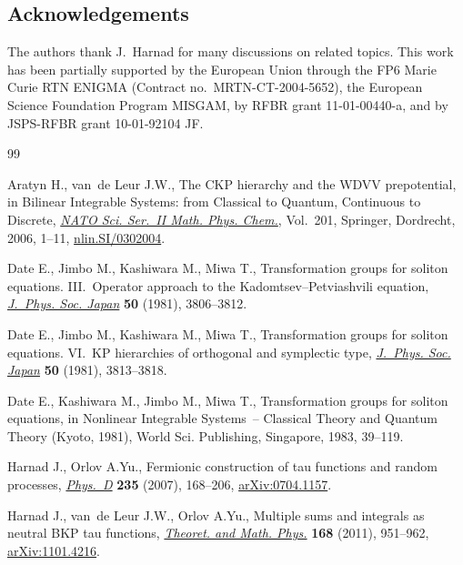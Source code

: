 \documentclass[pdftex]{sigma}
\numberwithin{equation}{section}
\begin{document}
\subsection*{Acknowledgements}

The authors thank J.~Harnad for many discussions on related topics.
This work has been partially supported by
the European Union through the FP6 Marie Curie RTN
ENIGMA (Contract no.~MRTN-CT-2004-5652), the European Science
Foundation Program MISGAM, by RFBR grant 11-01-00440-a, and by
JSPS-RFBR grant 10-01-92104 JF.

\begin{thebibliography}{99}
\footnotesize\itemsep=0pt

Aratyn H., van~de Leur J.W., The {CKP} hierarchy and the {WDVV} prepotential, in
  Bilinear Integrable Systems: from Classical to Quantum, Continuous to
  Discrete, \href{http://dx.doi.org/10.1007/978-1-4020-3503-6_1}{\textit{NATO Sci. Ser.~II Math. Phys. Chem.}}, Vol.~201, Springer,
  Dordrecht, 2006, 1--11, \href{http://arxiv.org/abs/nlin.SI/0302004}{nlin.SI/0302004}.

Date E., Jimbo M., Kashiwara M., Miwa T., Transformation groups for soliton
  equations. {III}.~{O}perator approach to the {K}adomtsev--{P}etviashvili
  equation, \href{http://dx.doi.org/10.1143/JPSJ.50.3806}{\textit{J.~Phys. Soc. Japan}} \textbf{50} (1981), 3806--3812.

Date E., Jimbo M., Kashiwara M., Miwa T., Transformation groups for soliton
  equations. {VI}.~{KP} hierarchies of orthogonal and symplectic type,
  \href{http://dx.doi.org/10.1143/JPSJ.50.3813}{\textit{J.~Phys. Soc. Japan}} \textbf{50} (1981), 3813--3818.

Date E., Kashiwara M., Jimbo M., Miwa T., Transformation groups for soliton
  equations, in Nonlinear Integrable Systems~-- Classical Theory and Quantum
  Theory ({K}yoto, 1981), World Sci. Publishing, Singapore, 1983, 39--119.

Harnad J., Orlov A.Yu., Fermionic construction of tau functions and random
  processes, \href{http://dx.doi.org/10.1016/j.physd.2007.05.011}{\textit{Phys.~D}} \textbf{235} (2007), 168--206,
  \href{http://arxiv.org/abs/0704.1157}{arXiv:0704.1157}.

Harnad J., van~de Leur J.W., Orlov A.Yu., Multiple sums and integrals as neutral BKP
  tau functions, \href{http://dx.doi.org/10.1007/s11232-011-0077-z}{\textit{Theoret. and Math. Phys.}} \textbf{168} (2011),
  951--962, \href{http://arxiv.org/abs/1101.4216}{arXiv:1101.4216}.


\end{thebibliography}
\end{document}

